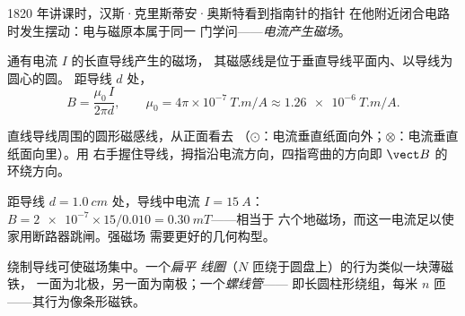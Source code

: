 \begin{remark}[奥斯特，1820]\label{rem:g11:magnetic-fields:oersted}
1820 年讲课时，汉斯·克里斯蒂安·奥斯特看到指南针的指针
在他附近闭合电路时发生摆动：电与磁原本属于同一
门学问——\emph{电流产生磁场}。
\end{remark}

\begin{proposition}[直导线的磁场]\label{prop:g11:magnetic-fields:wire}
通有电流 $I$ 的长直导线产生的磁场，
其磁感线是位于垂直导线平面内、以导线为圆心的圆。
距导线 $d$ 处，
\[
B = \frac{\mu_0\, I}{2\pi d},
\qquad \mu_0 = 4\pi\times 10^{-7}\ \unit{T.m/A} \approx \qty{1.26e-6}{T.m/A}.
\]
\end{proposition}
\admitted

\begin{omfigure}
\qquad\qquad
{}

{\small 直线导线周围的圆形磁感线，从正面看去
（$\odot$：电流垂直纸面向外；$\otimes$：电流垂直纸面向里）。用
右手握住导线，拇指沿电流方向，四指弯曲的方向即
$\vect B$ 的环绕方向。}
\end{omfigure}

\begin{example}[导线是一块弱磁铁]\label{ex:g11:magnetic-fields:wire}
距导线 $d = \qty{1.0}{cm}$ 处，导线中电流 $I = \qty{15}{A}$：
$B = \num{2e-7} \times 15 / 0.010 = \qty{0.30}{mT}$——相当于
六个地磁场，而这一电流足以使家用断路器跳闸。强磁场
需要更好的几何构型。
\end{example}

\begin{definition}[线圈与螺线管]\label{def:g11:magnetic-fields:solenoid}
绕制导线可使磁场集中。一个\emph{扁平
线圈}（$N$ 匝绕于圆盘上）的行为类似一块薄磁铁，
一面为北极，另一面为南极；一个\emph{螺线管}——
即长圆柱形绕组，每米 $n$ 匝——其行为像条形磁铁。
\end{definition}

